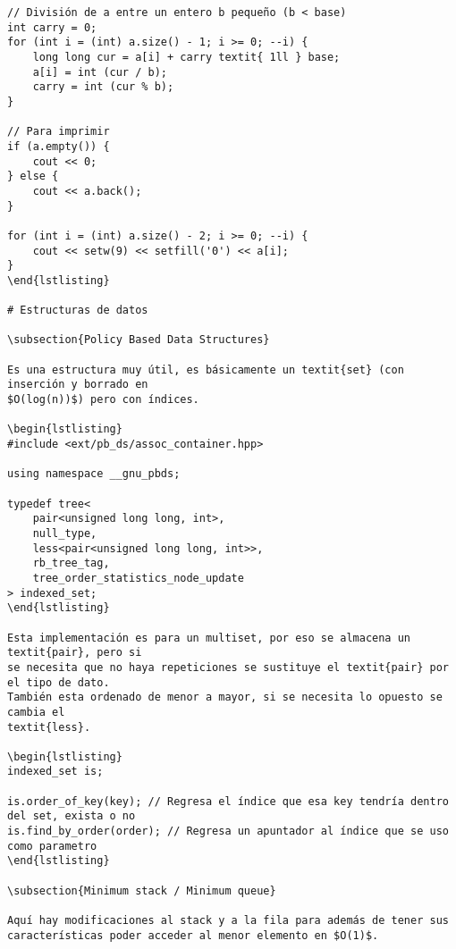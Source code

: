 \documentclass[11pt]{article}
\begin{document}
\begin{verbatim}
// División de a entre un entero b pequeño (b < base)
int carry = 0;
for (int i = (int) a.size() - 1; i >= 0; --i) {
    long long cur = a[i] + carry textit{ 1ll } base;
    a[i] = int (cur / b);
    carry = int (cur % b);
}

// Para imprimir
if (a.empty()) {
    cout << 0;
} else {
    cout << a.back();
}
        
for (int i = (int) a.size() - 2; i >= 0; --i) {
    cout << setw(9) << setfill('0') << a[i];
}
\end{lstlisting}

# Estructuras de datos

\subsection{Policy Based Data Structures}

Es una estructura muy útil, es básicamente un textit{set} (con inserción y borrado en
$O(log(n))$) pero con índices.

\begin{lstlisting}
#include <ext/pb_ds/assoc_container.hpp>

using namespace __gnu_pbds;

typedef tree<
    pair<unsigned long long, int>,
    null_type,
    less<pair<unsigned long long, int>>,
    rb_tree_tag,
    tree_order_statistics_node_update
> indexed_set;
\end{lstlisting}

Esta implementación es para un multiset, por eso se almacena un textit{pair}, pero si
se necesita que no haya repeticiones se sustituye el textit{pair} por el tipo de dato.
También esta ordenado de menor a mayor, si se necesita lo opuesto se cambia el
textit{less}.

\begin{lstlisting}
indexed_set is;

is.order_of_key(key); // Regresa el índice que esa key tendría dentro del set, exista o no
is.find_by_order(order); // Regresa un apuntador al índice que se uso como parametro
\end{lstlisting}

\subsection{Minimum stack / Minimum queue}

Aquí hay modificaciones al stack y a la fila para además de tener sus
características poder acceder al menor elemento en $O(1)$.


\end{verbatim}
\end{document}
